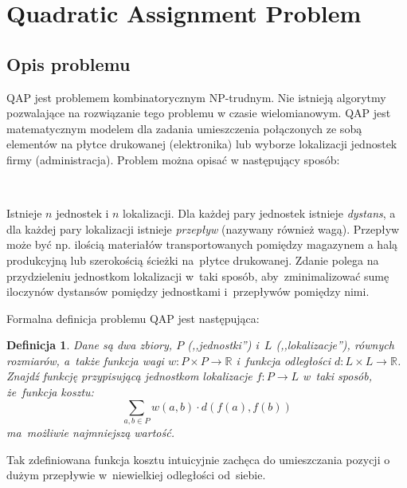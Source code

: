 \documentclass[a4paper,10pt]{article}
\newtheorem{definition}{Definicja}
\begin{document}


\section{Quadratic Assignment Problem}
\subsection{Opis problemu}
QAP jest problemem kombinatorycznym NP-trudnym. 
Nie istnieją algorytmy pozwalające na rozwiązanie tego problemu w czasie wielomianowym.
QAP jest matematycznym modelem dla zadania umieszczenia połączonych ze sobą elementów na płytce drukowanej (elektronika) lub wyborze lokalizacji jednostek firmy (administracja).
Problem można opisać w następujący sposób:

\vspace{0.2 cm}
\begin{minipage}{0.03\textwidth}
\mbox{ }
\end{minipage}
\hfill
\begin{minipage}{0.95\textwidth}
Istnieje $n$ jednostek i $n$ lokalizacji.
Dla każdej pary jednostek istnieje \emph{dystans}, a dla każdej pary lokalizacji istnieje \emph{przepływ} (nazywany również wagą).
Przepływ może być np. ilością materiałów transportowanych pomiędzy magazynem a halą produkcyjną lub szerokością ścieżki
na~płytce drukowanej.
Zdanie polega na przydzieleniu jednostkom lokalizacji w~taki sposób, aby~zminimalizować sumę iloczynów dystansów pomiędzy jednostkami
i~przepływów pomiędzy nimi.
\end{minipage}
\vspace{0.2 cm}

Formalna definicja problemu QAP jest następująca:
\begin{definition}
Dane są dwa zbiory, $P$ (,,jednostki'') i~$L$ (,,lokalizacje''), równych rozmiarów, a~także funkcja wagi 
$w: P \times P \rightarrow \mathbb{R}$ i~funkcja odległości $d: L \times L \rightarrow \mathbb{R}$.
Znajdź funkcję przypisującą jednostkom lokalizacje $f: P \rightarrow L$ w~taki sposób, że~funkcja kosztu:
\begin{equation}
\sum_{a,b\in P}w(a,b) \cdot d(f(a),f(b))
\label{eq:qap_cost}
\end{equation}
ma~możliwie najmniejszą wartość.
\end{definition}

Tak zdefiniowana funkcja kosztu intuicyjnie zachęca do umieszczania pozycji o dużym przepływie w~niewielkiej odległości od~siebie.
\end{document}

